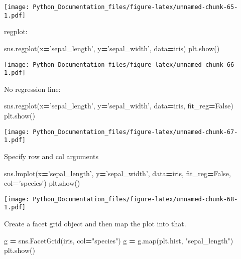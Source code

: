 \documentclass[]{book}
\newenvironment{Shaded}{\begin{snugshade}}{\end{snugshade}}
\newcommand{\BuiltInTok}[1]{#1}
\newcommand{\NormalTok}[1]{#1}
\newcommand{\OperatorTok}[1]{\textcolor[rgb]{0.81,0.36,0.00}{\textbf{#1}}}
\newcommand{\StringTok}[1]{\textcolor[rgb]{0.31,0.60,0.02}{#1}}
\newcommand{\VariableTok}[1]{\textcolor[rgb]{0.00,0.00,0.00}{#1}}
\theoremstyle{definition}
\theoremstyle{definition}
\theoremstyle{definition}
\theoremstyle{remark}
\begin{document}
\texttt{[image: Python\_Documentation\_files/figure-latex/unnamed-chunk-65-1.pdf]}

regplot:

\begin{Shaded}
\begin{Highlighting}[]
\NormalTok{sns.regplot(x}\OperatorTok{=}\StringTok{'sepal_length'}\NormalTok{, y}\OperatorTok{=}\StringTok{'sepal_width'}\NormalTok{, data}\OperatorTok{=}\NormalTok{iris)}
\NormalTok{plt.show()}
\end{Highlighting}
\end{Shaded}

\texttt{[image: Python\_Documentation\_files/figure-latex/unnamed-chunk-66-1.pdf]}

No regression line:

\begin{Shaded}
\begin{Highlighting}[]
\NormalTok{sns.regplot(x}\OperatorTok{=}\StringTok{'sepal_length'}\NormalTok{, y}\OperatorTok{=}\StringTok{'sepal_width'}\NormalTok{, data}\OperatorTok{=}\NormalTok{iris,}
\NormalTok{            fit_reg}\OperatorTok{=}\VariableTok{False}\NormalTok{)}
\NormalTok{plt.show()}
\end{Highlighting}
\end{Shaded}

\texttt{[image: Python\_Documentation\_files/figure-latex/unnamed-chunk-67-1.pdf]}

Specify row and col arguments

\begin{Shaded}
\begin{Highlighting}[]
\NormalTok{sns.lmplot(x}\OperatorTok{=}\StringTok{'sepal_length'}\NormalTok{, y}\OperatorTok{=}\StringTok{'sepal_width'}\NormalTok{, data}\OperatorTok{=}\NormalTok{iris,}
\NormalTok{           fit_reg}\OperatorTok{=}\VariableTok{False}\NormalTok{,}
\NormalTok{           col}\OperatorTok{=}\StringTok{'species'}\NormalTok{)}
\NormalTok{plt.show()}
\end{Highlighting}
\end{Shaded}

\texttt{[image: Python\_Documentation\_files/figure-latex/unnamed-chunk-68-1.pdf]}

Create a facet grid object and then map the plot into that.

\begin{Shaded}
\begin{Highlighting}[]
\NormalTok{g }\OperatorTok{=}\NormalTok{ sns.FacetGrid(iris, col}\OperatorTok{=}\StringTok{"species"}\NormalTok{)}
\NormalTok{g }\OperatorTok{=}\NormalTok{ g.}\BuiltInTok{map}\NormalTok{(plt.hist, }\StringTok{"sepal_length"}\NormalTok{)}
\NormalTok{plt.show()}
\end{Highlighting}
\end{Shaded}
\end{document}
